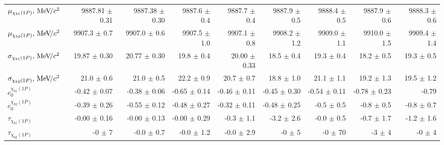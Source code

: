 \begin{table}[H]
{{\begin{tabular}{lrrrrrrrr}
\rule{0pt}{4ex}$\mu_{\chi_{b1}(1P)}, {\mathrm{\,Me\kern -0.1em V\!/}c^2}$ & 9887.81 $\pm$ 0.31 & 9887.38 $\pm$ 0.30 & 9887.6 $\pm$ 0.4 & 9887.7 $\pm$ 0.4 & 9887.9 $\pm$ 0.5 & 9888.4 $\pm$ 0.5 & 9887.9 $\pm$ 0.6 & 9888.3 $\pm$ 0.6\\
$\mu_{\chi_{b2}(1P)}, {\mathrm{\,Me\kern -0.1em V\!/}c^2}$ & 9907.3 $\pm$ 0.7 & 9907.0 $\pm$ 0.6 & 9907.5 $\pm$ 1.0 & 9907.1 $\pm$ 0.8 & 9908.2 $\pm$ 1.2 & 9909.0 $\pm$ 1.1 & 9910.0 $\pm$ 1.5 & 9909.4 $\pm$ 1.4\\

\rule{0pt}{4ex}$\sigma_{\chi_{b1}(1P)}, {\mathrm{\,Me\kern -0.1em V\!/}c^2}$ & 19.87 $\pm$ 0.30 & 20.77 $\pm$ 0.30 & 19.8 $\pm$ 0.4 & 20.00 $\pm$ 0.33 & 18.5 $\pm$ 0.4 & 19.3 $\pm$ 0.4 & 18.2 $\pm$ 0.5 & 19.3 $\pm$ 0.5\\
$\sigma_{\chi_{b2}(1P)}, {\mathrm{\,Me\kern -0.1em V\!/}c^2}$ & 21.0 $\pm$ 0.6 & 21.0 $\pm$ 0.5 & 22.2 $\pm$ 0.9 & 20.7 $\pm$ 0.7 & 18.8 $\pm$ 1.0 & 21.1 $\pm$ 1.1 & 19.2 $\pm$ 1.3 & 19.5 $\pm$ 1.2\\

\rule{0pt}{4ex}$c_0^{\chi_{b1}(1P)}$ & -0.42 $\pm$ 0.07 & -0.38 $\pm$ 0.06 & -0.65 $\pm$ 0.14 & -0.46 $\pm$ 0.11 & -0.45 $\pm$ 0.30 & -0.54 $\pm$ 0.11 & -0.78 $\pm$ 0.23 & -0.79\\
$c_0^{\chi_{b2}(1P)}$ & -0.39 $\pm$ 0.26 & -0.55 $\pm$ 0.12 & -0.48 $\pm$ 0.27 & -0.32 $\pm$ 0.11 & -0.48 $\pm$ 0.25 & -0.5 $\pm$ 0.5 & -0.8 $\pm$ 0.5 & -0.8 $\pm$ 0.7\\

\rule{0pt}{4ex}$\tau_{\chi_{b1}(1P)}$ & -0.00 $\pm$ 0.16 & -0.00 $\pm$ 0.13 & -0.00 $\pm$ 0.29 & -0.3 $\pm$ 1.1 & -3.2 $\pm$ 2.6 & -0.0 $\pm$ 0.5 & -0.7 $\pm$ 1.7 & -1.2 $\pm$ 1.6\\
$\tau_{\chi_{b2}(1P)}$ & -0 $\pm$ 7 & -0.0 $\pm$ 0.7 & -0.0 $\pm$ 1.2 & -0.0 $\pm$ 2.9 & -0 $\pm$ 5 & -0 $\pm$ 70 & -3 $\pm$ 4 & -0 $\pm$ 4\\
\bottomrule
\end{tabular}
} %

} %
\end{table}
